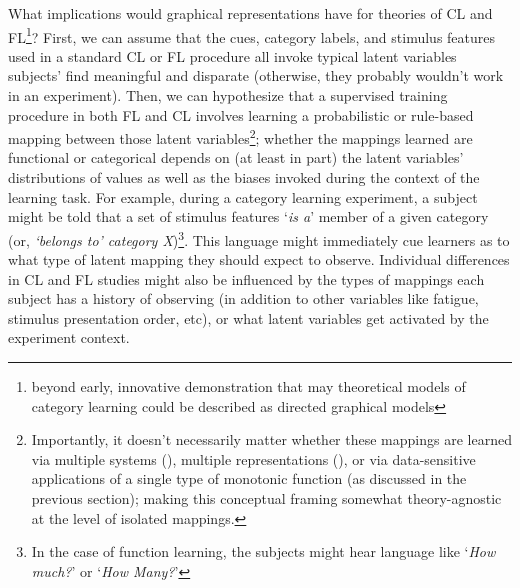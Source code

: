 \documentclass[12pt]{article}
\let\oldcite=\cite
\renewcommand{\cite}[1]{\textcolor[rgb]{0, .121, .388}{\oldcite{#1}}}
\begin{document}
What implications would graphical representations have for theories of CL and FL\footnote{beyond \cite{danks2007theory} early, innovative demonstration that may theoretical models of category learning could be described as directed graphical models}? First, we can assume that the cues, category labels, and stimulus features used in a standard CL or FL procedure all invoke typical latent variables subjects' find meaningful and disparate (otherwise, they probably wouldn't work in an experiment). Then, we can hypothesize that a supervised training procedure in both FL and CL involves learning a probabilistic or rule-based mapping between those latent variables\footnote{Importantly, it doesn't necessarily matter whether these mappings are learned via multiple systems (\cite{ashby1998neuropsychological}), multiple representations (\cite{erickson1998rules,kalish2004population}), or via data-sensitive applications of a single type of monotonic function (as discussed in the previous section); making this conceptual framing somewhat theory-agnostic at the level of isolated mappings.}; whether the mappings learned are functional or categorical depends on (at least in part) the latent variables' distributions of values as well as the biases invoked during the context of the learning task. For example, during a category learning experiment, a subject might be told that a set of stimulus features `\emph{is a}' member of a given category (or, \emph{`belongs to' category \emph{X}})\footnote{In the case of function learning, the subjects might hear language like `\emph{How much?}' or `\emph{How Many?}'}. This language might immediately cue learners as to what type of latent mapping they should expect to observe. Individual differences in CL and FL studies might also be influenced by the types of mappings each subject has a history of observing (in addition to other variables like fatigue, stimulus presentation order, etc), or what latent variables get activated by the experiment context.
\end{document}
